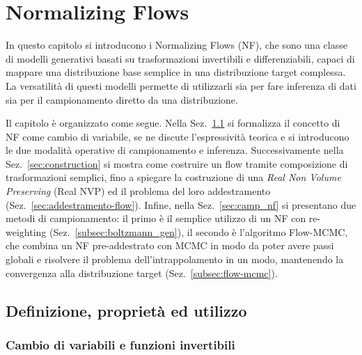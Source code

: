 \chapter{Normalizing Flows}
\label{ch:nf}
In questo capitolo si introducono i Normalizing Flows (NF), che sono una classe di modelli generativi basati su trasformazioni invertibili e differenziabili, capaci di mappare una distribuzione base semplice in una distribuzione target complessa. La versatilità di questi modelli permette di utilizzarli sia per fare inferenza di dati sia per il campionamento diretto da una distribuzione.

Il capitolo è organizzato come segue. Nella Sez.~\ref{sec:flows} si formalizza il concetto di NF come cambio di variabile, se ne discute l'espressività teorica e si introducono le due modalità operative di campionamento e inferenza. Successivamente nella Sez.~\ref{sec:construction} si mostra come costruire un flow tramite composizione di trasformazioni semplici, fino a spiegare la costruzione di una \emph{Real Non Volume Preserving} (Real NVP) ed il problema del loro addestramento (Sez.~\ref{sec:addestramento-flow}). Infine, nella Sez.~\ref{sec:camp_nf} si presentano due metodi di campionamento: il primo è il semplice utilizzo di un NF con re-weighting (Sez.~\ref{subsec:boltzmann_gen}), il secondo è l'algoritmo Flow-MCMC, che combina un NF pre-addestrato con MCMC in modo da poter avere passi globali e risolvere il problema dell'intrappolamento in un modo, mantenendo la convergenza alla distribuzione target (Sez.~\ref{subsec:flow-mcmc}).

\section{Definizione, proprietà ed utilizzo}
\label{sec:flows}
\subsection{Cambio di variabili e funzioni invertibili}

